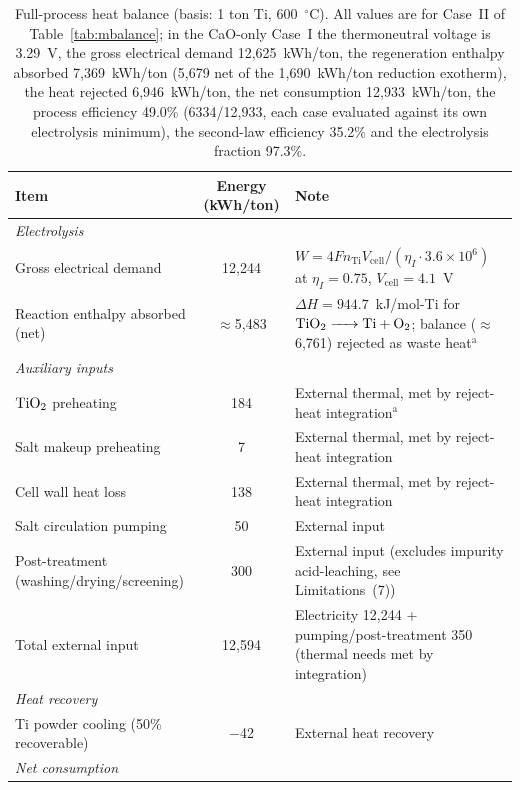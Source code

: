 \documentclass[11pt]{article}
\begin{document}
\begin{table}[!ht]
\centering
\footnotesize
\caption{Full-process heat balance (basis: 1 ton Ti, 600~$^{\circ}$C). All values are for Case~II of Table~\ref{tab:mbalance}; in the CaO-only Case~I the thermoneutral voltage is 3.29~V, the gross electrical demand 12{,}625~kWh/ton, the regeneration enthalpy absorbed 7{,}369~kWh/ton (5{,}679 net of the 1{,}690~kWh/ton reduction exotherm), the heat rejected 6{,}946~kWh/ton, the net consumption 12{,}933~kWh/ton, the process efficiency 49.0\% (6334/12{,}933, each case evaluated against its own electrolysis minimum), the second-law efficiency 35.2\% and the electrolysis fraction 97.3\%.}
\label{tab:heatbal}
\begin{tabularx}{\linewidth}{l c X}
\toprule
Item & Energy (kWh/ton) & Note \\
\midrule
\multicolumn{3}{l}{\textit{Electrolysis}} \\
\quad Gross electrical demand & 12{,}244 & $W = 4F n_{\mathrm{Ti}} V_{\mathrm{cell}}/(\eta_I \cdot 3.6{\times}10^6)$ at $\eta_I=0.75$, $V_{\mathrm{cell}}=4.1$~V \\
\quad Reaction enthalpy absorbed (net) & $\approx$5{,}483 & $\Delta H = 944.7$~kJ/mol-Ti for $\ce{TiO2 -> Ti + O2}$; balance ($\approx$6{,}761) rejected as waste heat$^{\mathrm{a}}$ \\
\midrule
\multicolumn{3}{l}{\textit{Auxiliary inputs}} \\
\quad $\ce{TiO2}$ preheating & 184 & External thermal, met by reject-heat integration$^{\mathrm{a}}$ \\
\quad Salt makeup preheating & 7 & External thermal, met by reject-heat integration \\
\quad Cell wall heat loss & 138 & External thermal, met by reject-heat integration \\
\quad Salt circulation pumping & 50 & External input \\
\quad Post-treatment (washing/drying/screening) & 300 & External input (excludes impurity acid-leaching, see Limitations~(7)) \\
\midrule
\quad Total external input & 12{,}594 & Electricity 12{,}244 + pumping/post-treatment 350 (thermal needs met by integration) \\
\midrule
\multicolumn{3}{l}{\textit{Heat recovery}} \\
\quad Ti powder cooling (50\% recoverable) & $-$42 & External heat recovery \\
\midrule
\multicolumn{3}{l}{\textit{Net consumption}} \\

\end{tabularx}
\end{table}
\end{document}
